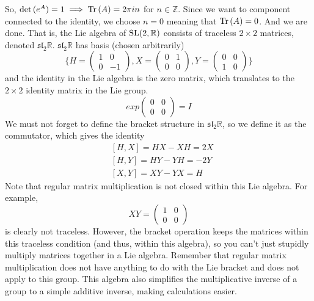   So, $\det{(e^A)} = 1 \implies \operatorname{Tr}{(A)} = 2 \pi i n$ for $n \in \mathbb{Z}$. Since we want to component connected to the identity, we choose $n=0$ meaning that $\operatorname{Tr}{(A)} = 0$. And we are done. That is, the Lie algebra of $\operatorname{SL}(2, \mathbb{R})$ consists of traceless $2 \times 2$ matrices, denoted $\mathfrak{sl}_2 \mathbb{R}$. $\mathfrak{sl}_2 \mathbb{R}$ has basis (chosen arbitrarily) 
  \begin{equation}
    \bigg\{ H = \begin{pmatrix}
    1&0\\0&-1
    \end{pmatrix}, X = \begin{pmatrix}
    0&1\\0&0
    \end{pmatrix}, Y = \begin{pmatrix}
    0&0\\1&0
    \end{pmatrix}\bigg\}
  \end{equation}
  and the identity in the Lie algebra is the zero matrix, which translates to the $2 \times 2$ identity matrix in the Lie group. 
  \begin{equation}
    exp \begin{pmatrix}
    0&0\\0&0
    \end{pmatrix} = I
  \end{equation}
  We must not forget to define the bracket structure in $\mathfrak{sl}_2 \mathbb{R}$, so we define it as the commutator, which gives the identity
  \begin{align*}
    & [H,X] = HX - XH = 2X \\
    & [H,Y] = HY - YH = -2Y \\
    & [X,Y] = XY - YX = H
  \end{align*}
  Note that regular matrix multiplication is not closed within this Lie algebra. For example, 
  \begin{equation}
    X Y = \begin{pmatrix}
    1&0\\0&0
    \end{pmatrix}
  \end{equation}
  is clearly not traceless. However, the bracket operation keeps the matrices within this traceless condition (and thus, within this algebra), so you can't just stupidly multiply matrices together in a Lie algebra. Remember that regular matrix multiplication does not have anything to do with the Lie bracket and does not apply to this group. This algebra also simplifies the multiplicative inverse of a group to a simple additive inverse, making calculations easier. 

